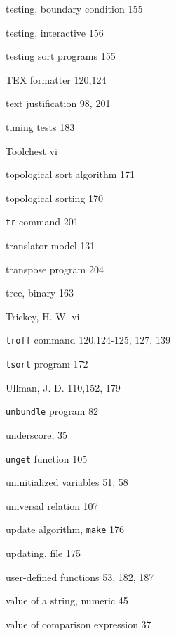 \begin{multicols}{3}
\hangindent=3pc  testing, boundary condition 155

\hangindent=3pc  testing, interactive 156

\hangindent=3pc  testing sort programs 155

\hangindent=3pc  TEX formatter 120,124

\hangindent=3pc  text justification 98, 201

\hangindent=3pc  timing tests 183

\hangindent=3pc  Toolchest vi

\hangindent=3pc  topological sort algorithm 171

\hangindent=3pc  topological sorting 170

\hangindent=3pc  \verb'tr' command 201

\hangindent=3pc  translator model 131

\hangindent=3pc  transpose program 204

\hangindent=3pc  tree, binary 163

\hangindent=3pc  Trickey, H. W. vi

\hangindent=3pc  \verb'troff' command 120,124-125, 127, 139

\hangindent=3pc  \verb'tsort' program 172





\hangindent=3pc  Ullman, J. D. 110,152, 179

\hangindent=3pc  \verb'unbundle' program 82

\hangindent=3pc  underscore, 35

\hangindent=3pc  \verb'unget' function 105

\hangindent=3pc  uninitialized variables 51, 58

\hangindent=3pc  universal relation 107

\hangindent=3pc  update algorithm, \verb'make' 176

\hangindent=3pc  updating, file 175

\hangindent=3pc  user-defined functions 53, 182,  187

\hangindent=3pc  value of a string, numeric 45

\hangindent=3pc  value of comparison expression 37


\end{multicols}
